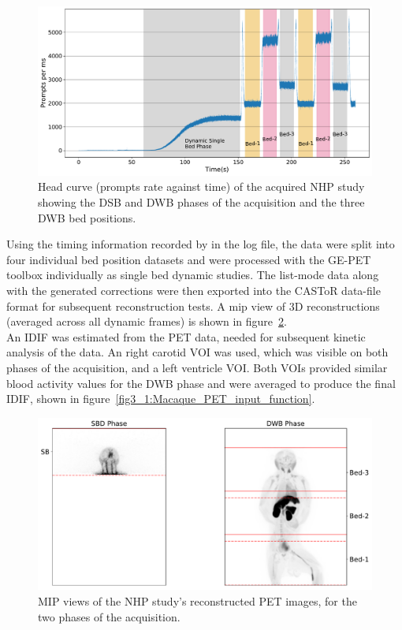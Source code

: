 \begin{figure} [ht!]
\centering
\includegraphics[scale=0.45,angle=0]{3_Results/3_1_DWB_Optimization/figures/3_1_Macaque_Head_curve_Phases.pdf}
\caption{Head curve (prompts rate against time) of the acquired NHP study showing the DSB and DWB phases of the acquisition and the three DWB bed positions.}
\label{fig3_1:Macaque_Head_Curve_Phases}
\end{figure}
%
Using the timing information recorded by in the log file, the data were split into four individual bed position datasets and were processed with the GE-PET toolbox individually as single bed dynamic studies. The list-mode data along with the generated corrections were then exported into the CASToR data-file format for subsequent reconstruction tests. A \gls{mip} view of 3D reconstructions (averaged across all dynamic frames) is shown in figure~\ref{fig3_1:Macaque_PET}. \\
An IDIF was estimated from the PET data, needed for subsequent kinetic analysis of the data. An right carotid VOI was used, which was visible on both phases of the acquisition, and a left ventricle VOI. Both VOIs provided similar blood activity values for the DWB phase and were averaged to produce the final IDIF, shown in figure~\ref{fig3_1:Macaque_PET_input_function}.
%
\begin{figure} [ht!]
\centering
\includegraphics[scale=0.45,angle=0]{3_Results/3_1_DWB_Optimization/figures/3_1_Macaque_PET.pdf}
\caption{MIP views of the NHP study's reconstructed PET images, for the two phases of the acquisition.}
\label{fig3_1:Macaque_PET}
\end{figure}
